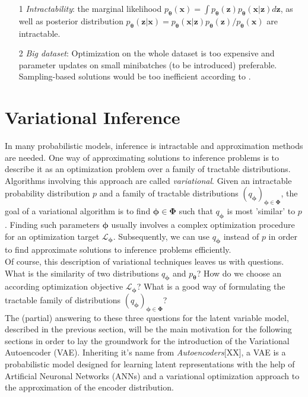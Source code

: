 \documentclass[12pt]{report}
\theoremstyle{definition}
\begin{document}
\begin{itemize}
	\item[1] \emph{Intractability}: the marginal likelihood $p_{\pmb{\theta}}(\mathbf{x}) = \int p_{\pmb{\theta}}(\mathbf{z}) p_{\pmb{\theta}}(\mathbf{x}|\mathbf{z}) d \mathbf{z}$, as well as posterior distribution $p_{\pmb{\theta}}(\mathbf{z}|\mathbf{x}) = p_{\pmb{\theta}}(\mathbf{x}|\mathbf{z}) p_{\pmb{\theta}}(\mathbf{z}) / p_{\pmb{\theta}}(\mathbf{x})$ are intractable.
	\item[2] \emph{Big dataset}: Optimization on the whole dataset is too expensive and parameter updates on small minibatches (to be introduced) preferable. Sampling-based solutions would be too inefficient according to \cite{kingma1}.
\end{itemize}

\section{Variational Inference}
In many probabilistic models, inference is intractable and approximation methods are needed. One way of approximating solutions to inference problems is to describe it as an optimization problem over a family of tractable distributions. Algorithms involving this approach are called \emph{variational}.
Given an intractable probability distribution $p$ and a family of tractable distributions $(q_{\pmb{\phi}})_{\pmb{\phi} \in \pmb{\Phi}}$, the goal of a variational algorithm is to find $\pmb{\phi} \in \pmb{\Phi}$ such that $q_{\pmb{\phi}}$ is most 'similar' to $p$. Finding such parameters $\pmb{\phi}$ usually involves a complex optimization procedure for an optimization target $\mathcal{L}_{\pmb{\phi}}$. Subsequently, we can use $q_{\pmb{\phi}}$ instead of $p$ in order to find approximate solutions to inference problems efficiently.\\
Of course, this description of variational techniques leaves us with questions. What is the similarity of two distributions $q_{\pmb{\phi}}$ and $p_{\pmb{\theta}}$? How do we choose an according optimization objective $\mathcal{L}_{\pmb{\phi}}$? What is a good way of formulating the tractable family of distributions $(q_{\pmb{\phi}})_{\pmb{\phi} \in \pmb{\Phi}}$? \\
The (partial) answering to these three questions for the latent variable model, described in the previous section, will be the main motivation for the following sections in order to lay the groundwork for the introduction of the Variational Autoencoder (VAE). Inheriting it's name from \emph{Autoencoders}[XX], a VAE is a probabilistic model designed for learning latent representations with the help of Artificial Neuronal Networks (ANNs) and a variational optimization approach to the approximation of the encoder distribution.
\end{document}
